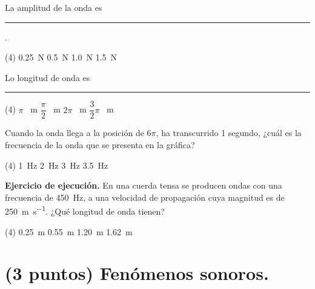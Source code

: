 \documentclass[12pt]{exam}
\begin{document}
\begin{questions}
    \question \label{pregunta_01} La amplitud de la onda es \rule{2cm}{0.1mm}. 
    \begin{tasks}(4)
        \task \SI{0.25}{\newton}
        \task \SI{0.5}{\newton}
        \task \SI{1.0}{\newton}
        \task \SI{1.5}{\newton}
    \end{tasks}
    \question \label{pregunta_02} Lo longitud de onda es \rule{2cm}{0.1mm} 
    \begin{tasks}(4)
        \task $\pi$ \, \unit{\meter}
        \task $\dfrac{\pi}{2}$ \, \unit{\meter}
        \task $2 \pi$ \, \unit{\meter}
        \task $\dfrac{3}{2} \pi$ \, \unit{\meter}
    \end{tasks}
    \question \label{pregunta_03} Cuando la onda llega a la posición de $6 \pi$, ha transcurrido 1 segundo, ¿cuál es la frecuencia de la onda que se presenta en la gráfica?
    \begin{tasks}(4)
        \task \SI{1}{\hertz}
        \task \SI{2}{\hertz}
        \task \SI{3}{\hertz}
        \task \SI{3.5}{\hertz}
    \end{tasks}
    \question \label{Ejercicio_01} \textbf{Ejercicio de ejecución.} En una cuerda tensa se producen ondas con una frecuencia de \SI{450}{\hertz}, a una velocidad de propagación cuya magnitud es de \SI{250}{\meter\per\second}. ¿Qué longitud de onda tienen?
    \begin{tasks}(4)
        \task \SI{0.25}{\meter}
        \task \SI{0.55}{\meter}
        \task \SI{1.20}{\meter}
        \task \SI{1.62}{\meter}
   \end{tasks}

    \section{(3 puntos) Fenómenos sonoros.}


\end{questions}
\end{document}
